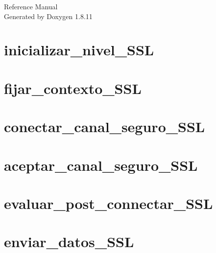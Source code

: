 \documentclass[twoside]{book}
\newcommand{\+}{\discretionary{\mbox{\scriptsize$\hookleftarrow$}}{}{}}
\newcommand{\clearemptydoublepage}{%
  \newpage{\pagestyle{empty}\cleardoublepage}%
}
\begin{document}
\hypersetup{pageanchor=false,
             bookmarksnumbered=true,
             pdfencoding=unicode
            }
\begin{titlepage}
\vspace*{7cm}
\begin{center}%
{\Large Reference Manual}\\
\vspace*{1cm}
{\large Generated by Doxygen 1.8.11}\\
\end{center}
\end{titlepage}
\clearemptydoublepage
\tableofcontents
\clearemptydoublepage
{}
\hypersetup{pageanchor=true}

\chapter{inicializar\+\_\+nivel\+\_\+\+S\+SL}
\label{inicializar_nivel_SSL}
\hypertarget{inicializar_nivel_SSL}{}

\chapter{fijar\+\_\+contexto\+\_\+\+S\+SL}
\label{fijar_contexto_SSL}
\hypertarget{fijar_contexto_SSL}{}

\chapter{conectar\+\_\+canal\+\_\+seguro\+\_\+\+S\+SL}
\label{conectar_canal_seguro_SSL}
\hypertarget{conectar_canal_seguro_SSL}{}

\chapter{aceptar\+\_\+canal\+\_\+seguro\+\_\+\+S\+SL}
\label{aceptar_canal_seguro_SSL}
\hypertarget{aceptar_canal_seguro_SSL}{}

\chapter{evaluar\+\_\+post\+\_\+connectar\+\_\+\+S\+SL}
\label{evaluar_post_connectar_SSL}
\hypertarget{evaluar_post_connectar_SSL}{}

\chapter{enviar\+\_\+datos\+\_\+\+S\+SL}
\label{enviar_datos_SSL}
\hypertarget{enviar_datos_SSL}{}

\end{document}
